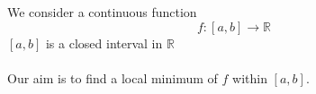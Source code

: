 \documentclass[a5paper,17pt]{extarticle}
\begin{document}
We consider a continuous function
$$
f: [a,b]\rightarrow \mathbb{R}
$$
$[a,b]$ is a closed interval in $\mathbb{R}$
\\
\\
Our aim is to find a local minimum of $f$ within $[a,b]$.
\\
\end{document}
